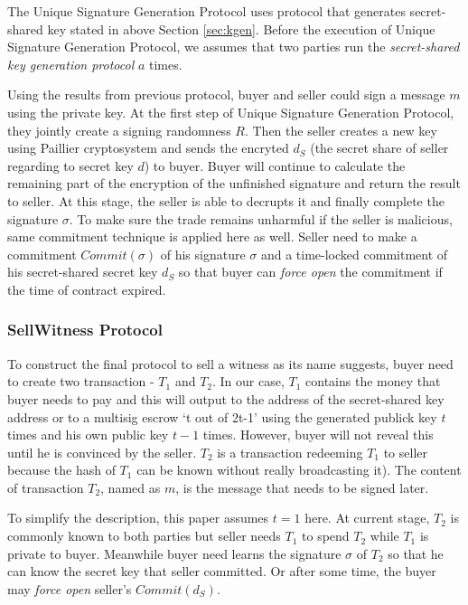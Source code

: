 \documentclass[12pt]{article}
\begin{document}
The Unique Signature Generation Protocol uses protocol that generates secret-shared key stated in above Section \ref{sec:kgen}. Before the execution of Unique Signature Generation Protocol, we assumes that two parties run the \textit{secret-shared key generation protocol} $a$ times.

Using the results from previous protocol, buyer and seller could sign a message $m$ using the private key. At the first step of Unique Signature Generation Protocol, they jointly create a signing randomness $R$. Then the seller creates a new key using Paillier cryptosystem and sends the encryted ${d_S}$ (the secret share of seller regarding to secret key $d$) to buyer. Buyer will continue to calculate the remaining part of the encryption of the unfinished signature and return the result to seller. At this stage, the seller is able to decrupts it and finally complete the signature $\sigma$. To make sure the trade remains unharmful if the seller is malicious, same commitment technique is applied here as well. Seller need to make a commitment $Commit({\sigma})$ of his signature $\sigma$ and a time-locked commitment of his secret-shared secret key ${d_S}$ so that buyer can \textit{force open} the commitment if the time of contract expired. 

\subsubsection{SellWitness Protocol}

To construct the final protocol to sell a witness as its name suggests, buyer need to create two transaction - ${T_1}$ and ${T_2}$. In our case, ${T_1}$ contains the money that buyer needs to pay and this will output to the address of the secret-shared key address or to a multisig escrow `t out of 2t-1' using the generated publick key $t$ times and his own public key $t-1$ times. However, buyer will not reveal this until he is convinced by the seller. ${T_2}$ is a transaction redeeming ${T_1}$ to seller because the hash of ${T_1}$ can be known without really broadcasting it). The content of transaction ${T_2}$, named as $m$, is the message that needs to be signed later.

To simplify the description, this paper assumes $t=1$ here. At current stage, ${T_2}$ is commonly known to both parties but seller needs ${T_1}$ to spend ${T_2}$ while ${T_1}$ is private to buyer. Meanwhile buyer need learns the signature $\sigma$ of ${T_2}$ so that he can know the secret key that seller committed. Or after some time, the buyer may \textit{force open} seller's $Commit({d_S})$.
\end{document}
